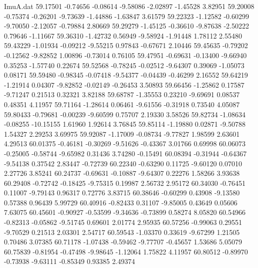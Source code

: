 \begin{filecontents}{ImuA.dat}
  59.17501   -0.74656   -0.08614   -9.58086   -2.02897   -1.45528    3.82951
  59.20008   -0.75374   -0.26201   -9.73639   -1.44886   -1.63847    3.61579
  59.22323   -1.12582   -0.60299   -9.70050   -2.12057   -0.79884    2.80669
  59.29279   -1.45125   -0.36610   -9.87638   -2.50222    0.79646   -1.11667
  59.36310   -1.42732    0.56949   -9.58924   -1.91448    1.78112    2.55480
  59.43229   -1.01934   -0.09212   -9.55215    0.97843   -0.67671    2.10446
  59.45635   -0.79202   -0.12562   -9.82852    1.00896   -0.73014    0.76105
  59.47951   -0.69631   -0.13400   -9.66940    0.35253   -1.57740    0.22674
  59.52568   -0.78245   -0.02512   -9.64307    0.39069   -1.05073    0.08171
  59.59480   -0.98345   -0.07418   -9.54377   -0.04439   -0.46299    2.16552
  59.64219   -1.21914    0.04307   -9.82852   -0.02149   -0.26453    3.50893
  59.66456   -1.25862    0.17587   -9.71247    0.21513    0.32321    3.82188
  59.68787   -1.35553    0.23210   -9.69691    0.08537    0.48351    4.11957
  59.71164   -1.28614    0.06461   -9.61556   -0.31918    0.73540    4.05087
  59.80433   -0.79681   -0.00239   -9.60599    0.75707    2.19330    3.58526
  59.82734   -1.08634   -0.08255  -10.15155    1.61960    1.92614    3.76845
  59.85114   -1.19880    0.02871   -9.50788    1.54327    2.29253    3.69975
  59.92087   -1.17009   -0.08734   -9.77827    1.98599    2.63601    4.29513
  60.01375   -0.46181   -0.30269   -9.51626   -0.43367    3.01766    0.69998
  60.06073   -0.25005   -0.58744   -9.65982    0.31436    3.74280   -0.15491
  60.08394   -0.31944   -0.64367   -9.54138    0.37542    2.83447   -0.72739
  60.22340   -0.63290    0.11725   -9.60120    0.07010    2.27726    3.85241
  60.24737   -0.69631   -0.10887   -9.64307    0.22276    1.58266    3.93638
  60.29408   -0.72742   -0.18425   -9.75315    0.19987    2.56732    2.95172
  60.34030   -0.76451    0.11007   -9.79143    0.96317    0.72776    3.83715
  60.38646   -0.60299    0.43908   -9.13580    0.57388    0.96439    5.99729
  60.40916   -0.82433    0.31107   -9.85005    0.43649    0.05606    7.63075
  60.45601   -0.90927   -0.53599   -9.34636   -0.73899    0.58274    8.05820
  60.54966   -0.82313   -0.05862   -9.51745    0.69601    2.01774    2.95935
  60.57256   -0.99063    0.29551   -9.70529    0.21513    2.03301    2.54717
  60.59543   -1.03370    0.33619   -9.67299    1.21505    0.70486    3.07385
  60.71178   -1.07438   -0.59462   -9.77707   -0.45657    1.53686    5.05079
  60.75839   -0.81954   -0.47498   -9.98645   -1.12064    1.75822    4.11957
  60.80512   -0.89970   -0.73938   -9.63111   -0.85349    0.93385    2.49374

\end{filecontents}
